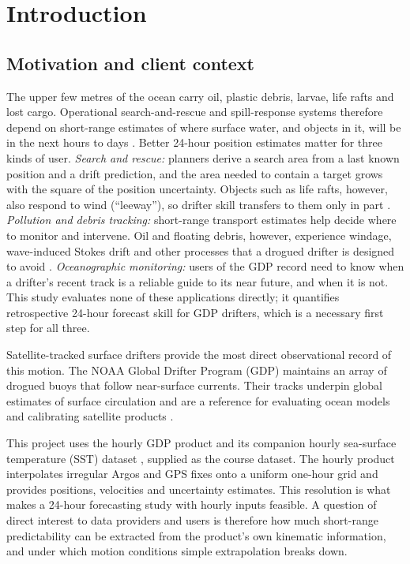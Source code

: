 \section{Introduction}\label{sec:intro}

\subsection{Motivation and client context}
The upper few metres of the ocean carry oil, plastic debris, larvae, life rafts and lost cargo. Operational search-and-rescue and spill-response systems therefore depend on short-range estimates of where surface water, and objects in it, will be in the next hours to days \citep{breivik2008,vansebille2018}. Better 24-hour position estimates matter for three kinds of user. \emph{Search and rescue:} planners derive a search area from a last known position and a drift prediction, and the area needed to contain a target grows with the square of the position uncertainty. Objects such as life rafts, however, also respond to wind (``leeway''), so drifter skill transfers to them only in part \citep{breivik2008,breivik2011}. \emph{Pollution and debris tracking:} short-range transport estimates help decide where to monitor and intervene. Oil and floating debris, however, experience windage, wave-induced Stokes drift and other processes that a drogued drifter is designed to avoid \citep{vansebille2020}. \emph{Oceanographic monitoring:} users of the GDP record need to know when a drifter's recent track is a reliable guide to its near future, and when it is not. This study evaluates none of these applications directly; it quantifies retrospective 24-hour forecast skill for GDP drifters, which is a necessary first step for all three.

Satellite-tracked surface drifters provide the most direct observational record of this motion. The NOAA Global Drifter Program (GDP) maintains an array of drogued buoys that follow near-surface currents. Their tracks underpin global estimates of surface circulation and are a reference for evaluating ocean models and calibrating satellite products \citep{lumpkin2013,centurioni2019}.

This project uses the hourly GDP product \citep{elipot2016} and its companion hourly sea-surface temperature (SST) dataset \citep{elipot2022sst}, supplied as the course dataset. The hourly product interpolates irregular Argos and GPS fixes onto a uniform one-hour grid and provides positions, velocities and uncertainty estimates. This resolution is what makes a 24-hour forecasting study with hourly inputs feasible. A question of direct interest to data providers and users is therefore how much short-range predictability can be extracted from the product's own kinematic information, and under which motion conditions simple extrapolation breaks down.

